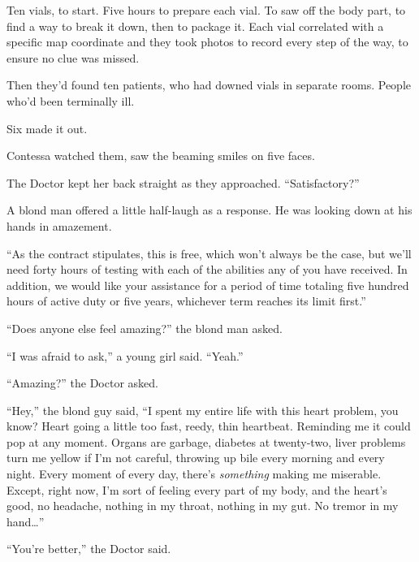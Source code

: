 Ten vials, to start.  Five hours to prepare each vial.  To saw off the body part, to find a way to break it down, then to package it.  Each vial correlated with a specific map coordinate and they took photos to record every step of the way, to ensure no clue was missed.



Then they'd found ten patients, who had downed vials in separate rooms.  People who'd been terminally ill.



Six made it out.



Contessa watched them, saw the beaming smiles on five faces.



The Doctor kept her back straight as they approached.  ``Satisfactory?''



A blond man offered a little half-laugh as a response.  He was looking down at his hands in amazement.



``As the contract stipulates, this is free, which won't always be the case, but we'll need forty hours of testing with each of the abilities any of you have received.  In addition, we would like your assistance for a period of time totaling five hundred hours of active duty or five years, whichever term reaches its limit first.''



``Does anyone else feel amazing?'' the blond man asked.



``I was afraid to ask,'' a young girl said.  ``Yeah.''



``Amazing?'' the Doctor asked.



``Hey,'' the blond guy said, ``I spent my entire life with this heart problem, you know?  Heart going a little too fast, reedy, thin heartbeat.  Reminding me it could pop at any moment.  Organs are garbage, diabetes at twenty-two, liver problems turn me yellow if I'm not careful, throwing up bile every morning and every night.  Every moment of every day, there's \emph{something} making me miserable.  Except, right now, I'm sort of feeling every part of my body, and the heart's good, no headache, nothing in my throat, nothing in my gut.  No tremor in my hand\ldots''



``You're better,'' the Doctor said.



